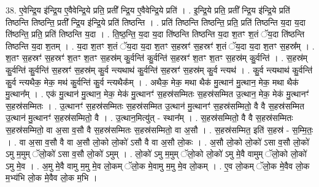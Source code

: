 \documentclass[17pt]{extarticle}
\begin{document}
38. ए॒वेन्द्रि॒य इ॑न्द्रि॒य ए॒वैवेन्द्रि॒ये प्रति॒ प्रती᳚ न्द्रि॒य ए॒वैवेन्द्रि॒ये प्रति॑ । . इ॒न्द्रि॒ये प्रति॒ प्रती᳚ न्द्रि॒य इ॑न्द्रि॒ये प्रति॑ तिष्ठन्ति तिष्ठन्ति॒ प्रती᳚ न्द्रि॒य इ॑न्द्रि॒ये प्रति॑ तिष्ठन्ति । . प्रति॑ तिष्ठन्ति तिष्ठन्ति॒ प्रति॒ प्रति॑ तिष्ठन्ति य॒दा य॒दा ति॑ष्ठन्ति॒ प्रति॒ प्रति॑ तिष्ठन्ति य॒दा । . ति॒ष्ठ॒न्ति॒ य॒दा य॒दा ति॑ष्ठन्ति तिष्ठन्ति य॒दा श॒तꣳ श॒तं ॅय॒दा ति॑ष्ठन्ति तिष्ठन्ति य॒दा श॒तम् । . य॒दा श॒तꣳ श॒तं ॅय॒दा य॒दा श॒तꣳ स॒हस्रꣳ॑ स॒हस्रꣳ॑ श॒तं ॅय॒दा य॒दा श॒तꣳ स॒हस्र᳚म् । . श॒तꣳ स॒हस्रꣳ॑ स॒हस्रꣳ॑ श॒तꣳ श॒तꣳ स॒हस्र॑म् कु॒र्वन्ति॑ कु॒र्वन्ति॑ स॒हस्रꣳ॑ श॒तꣳ श॒तꣳ स॒हस्र॑म् कु॒र्वन्ति॑ । . स॒हस्र॑म् कु॒र्वन्ति॑ कु॒र्वन्ति॑ स॒हस्रꣳ॑ स॒हस्र॑म् कु॒र्व न्त्यथाथ॑ कु॒र्वन्ति॑ स॒हस्रꣳ॑ स॒हस्र॑म् कु॒र्व न्त्यथ॑ । . कु॒र्व न्त्यथाथ॑ कु॒र्वन्ति॑ कु॒र्व न्त्यथैक॒ मेक॒ मथ॑ कु॒र्वन्ति॑ कु॒र्व न्त्यथैक᳚म् । . अथैक॒ मेक॒ मथा थैक॑ मु॒त्थान॑ मु॒त्थान॒ मेक॒ मथा थैक॑ मु॒त्थान᳚म् । . एक॑ मु॒त्थान॑ मु॒त्थान॒ मेक॒ मेक॑ मु॒त्थानꣳ॑ स॒हस्र॑सम्मितः स॒हस्र॑सम्मित उ॒त्थान॒ मेक॒ मेक॑ मु॒त्थानꣳ॑ स॒हस्र॑सम्मितः । . उ॒त्थानꣳ॑ स॒हस्र॑सम्मितः स॒हस्र॑सम्मित उ॒त्थान॑ मु॒त्थानꣳ॑ स॒हस्र॑सम्मितो॒ वै वै स॒हस्र॑सम्मित उ॒त्थान॑ मु॒त्थानꣳ॑ स॒हस्र॑सम्मितो॒ वै । . उ॒त्थान॒मित्यु॑त् - स्थान᳚म् । . स॒हस्र॑सम्मितो॒ वै वै स॒हस्र॑सम्मितः स॒हस्र॑सम्मितो॒ वा अ॒सा व॒सौ वै स॒हस्र॑सम्मितः स॒हस्र॑सम्मितो॒ वा अ॒सौ । . स॒हस्र॑सम्मित॒ इति॑ स॒हस्र॑ - स॒म्मि॒तः॒ । . वा अ॒सा व॒सौ वै वा अ॒सौ लो॒को लो॒को॑ ऽसौ वै वा अ॒सौ लो॒कः । . अ॒सौ लो॒को लो॒को॑ ऽसा व॒सौ लो॒को॑ ऽमु म॒मुम् ॅलो॒को॑ ऽसा व॒सौ लो॒को॑ ऽमुम् । . लो॒को॑ ऽमु म॒मुम् ॅलो॒को लो॒को॑ ऽमु मे॒वै वामुम् ॅलो॒को लो॒को॑ ऽमु मे॒व । . अ॒मु मे॒वै वामु म॒मु मे॒व लो॒कम् ॅलो॒क मे॒वामु म॒मु मे॒व लो॒कम् । . ए॒व लो॒कम् ॅलो॒क मे॒वैव लो॒क म॒भ्य॑भि लो॒क मे॒वैव लो॒क म॒भि । \newline
\end{document}
